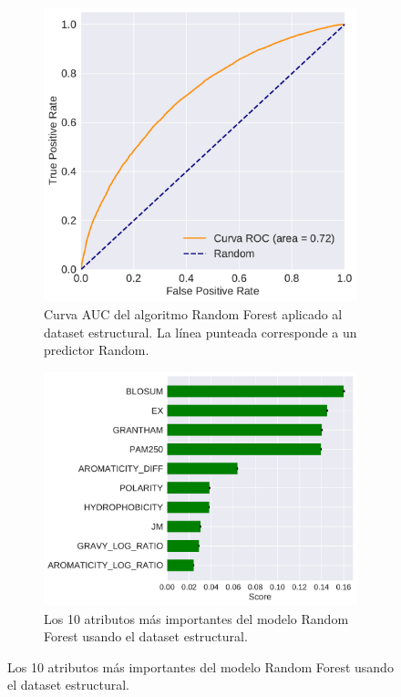 \begin{figure}[H]
\centering
\begin{subfigure}[b]{0.7\textwidth}
    \centering
    \includegraphics[width=\textwidth]{documents/latex/figures/3/structural/auc_structural.pdf}
    \caption{Curva AUC del algoritmo Random Forest aplicado al dataset estructural. La línea punteada corresponde a un predictor Random.}
    \label{fig:auc_structural}
\end{subfigure}

\hfill
\hfill

\begin{subfigure}[b]{0.7\textwidth}
    \centering
    \includegraphics[width=\textwidth]{documents/latex/figures/3/structural/importances_structural.pdf}
    \caption{Los 10 atributos más importantes del modelo Random Forest usando el dataset estructural.}
    \label{fig:importances_structural}
\end{subfigure}

\end{figure}

